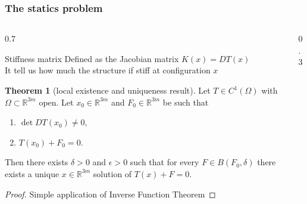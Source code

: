 \documentclass[10pt]{beamer}
\theoremstyle{definition}
\newtheorem{teorema}{Theorem}
\begin{document}
\begin{frame}

\frametitle{The statics problem}

\begin{columns}
\begin{column}{0.7\framewidth}
\begin{block}{Stiffness matrix}
Defined as the Jacobian matrix $K(x)=DT(x)$ \\
It tell us how much the structure if stiff at configuration $x$
\end{block}
\begin{teorema}[local existence and uniqueness result]
Let $T\in C^1(\Omega)$ with $\Omega\subset\mathbb{R}^{3m}$ open. Let $x_0\in\mathbb{R}^{3m}$ and $F_0\in\mathbb{R}^{3m}$ be such that
\begin{enumerate}
\item $\det DT(x_0)\neq0$,
\item $T(x_0)+F_0=0$.
\end{enumerate}
Then there exists $\delta>0$ and $\epsilon>0$ such that for every $F\in B(F_0,\delta)$ there exists a unique $x\in\mathbb{R}^{3m}$ solution of $T(x)+F=0$.
\end{teorema}
\begin{proof}
Simple application of Inverse Function Theorem
\end{proof}
\end{column}
\begin{column}{0.3\framewidth}
\begin{center}
\end{center}
\vspace{20pt}
\begin{center}
\end{center}
\end{column}
\end{columns}

\end{frame}
\end{document}
